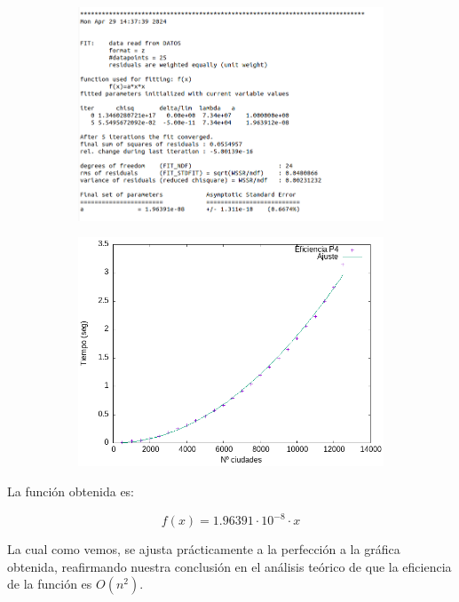 \documentclass{article}
\begin{document}
\begin{figure}[H]
    \begin{subfigure}{0.5\textwidth}
        \centering
        \includegraphics[width=\textwidth]{Problema4/imagenes/logP4.png}
    \end{subfigure} \hfill
    \begin{subfigure}{0.5\textwidth}
        \centering
        \includegraphics[width=\textwidth]{Problema4/imagenes/regresion_cuadraticaP4.png}
    \end{subfigure}
\end{figure}

La función obtenida es:

\[
    f(x) = 1.96391 \cdot 10^{-8} \cdot x
\]

La cual como vemos, se ajusta prácticamente a la perfección a la gráfica obtenida, reafirmando nuestra conclusión en el análisis teórico de que la eficiencia de la función es $O(n^2)$.
\end{document}
